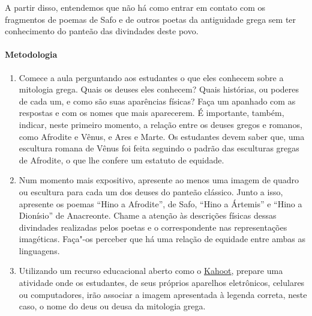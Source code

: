 \documentclass[12pt]{extarticle}
\begin{document}
A partir disso, entendemos que não há como entrar em contato com os fragmentos 
de poemas de Safo e de outros poetas da antiguidade grega sem ter conhecimento 
do panteão das divindades deste povo.


\paragraph{Metodologia}

\begin{enumerate}
\item
Comece a aula perguntando aos estudantes o que eles conhecem sobre 
a mitologia grega. Quais os deuses eles conhecem? Quais histórias,
ou poderes de cada um, e como são suas aparências físicas? Faça um apanhado
com as respostas e com os nomes que mais aparecerem. É importante, também,
indicar, neste primeiro momento, a relação entre os deuses gregos e romanos,
como Afrodite e Vênus, e Ares e Marte. Os estudantes devem saber que, uma escultura
romana de Vênus foi feita seguindo o padrão das esculturas gregas de Afrodite,
o que lhe confere um estatuto de equidade. 

\item
Num momento mais expositivo, apresente ao menos uma imagem de quadro ou escultura
para cada um dos deuses do panteão clássico.  Junto a isso, apresente os poemas
``Hino a Afrodite'', de Safo, ``Hino a Ártemis'' e ``Hino a Dionísio'' de Anacreonte.
Chame a atenção às descrições físicas dessas divindades realizadas pelos poetas
e o correspondente nas representações imagéticas. Faça"-os perceber que há uma
relação de equidade entre ambas as linguagens. 


\item
Utilizando um recurso educacional aberto como o \href{https://kahoot.com}{Kahoot}, 
prepare uma atividade onde os
estudantes, de seus próprios aparelhos eletrônicos, celulares ou computadores, irão 
associar a imagem apresentada à legenda correta, neste caso, o nome do deus ou deusa 
da mitologia grega.

\end{enumerate}
\end{document}
